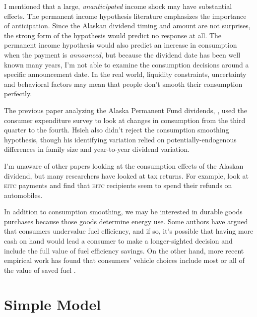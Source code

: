 \documentclass[11pt,letterpaper,oneside]{article}
\newcommand{\eitc}{\textsc{eitc}}
\begin{document}
\begin{doublespacing}
I mentioned that a large, \emph{unanticipated} income shock may have substantial effects.
The permanent income hypothesis literature emphasizes the importance of anticipation.
Since the Alaskan dividend timing and amount are not surprises, the strong form of the hypothesis would predict no response at all.
The permanent income hypothesis would also predict an increase in consumption when the payment is \emph{announced}, but because the dividend date has been well known many years, I'm not able to examine the consumption decisions around a specific announcement date.
In the real world, liquidity constraints, uncertainty and behavioral factors may mean that people don't smooth their consumption perfectly.

The previous paper analyzing the Alaska Permanent Fund dividends, \textcite{hsieh2003}, used the consumer expenditure survey to look at changes in consumption from the third quarter to the fourth.
Hsieh also didn't reject the consumption smoothing hypothesis, though his identifying variation relied on potentially\hyp{}endogenous differences in family size and year\hyp{}to\hyp{}year dividend variation.

I'm unaware of other papers looking at the consumption effects of the Alaskan dividend, but many researchers have looked at tax returns.
For example, \textcite{goodman2008eitc} look at \eitc{} payments and find that \eitc{} recipients seem to spend their refunds on automobiles.

In addition to consumption smoothing, we may be interested in durable goods purchases because those goods determine energy use.
Some authors have argued that consumers undervalue fuel efficiency, and if so, it's possible that having more cash on hand would lead a consumer to make a longer\hyp{}sighted decision and include the full value of fuel efficiency savings.
On the other hand, more recent empirical work has found that consumers' vehicle choices include most or all of the value of saved fuel \parencite{busse2013consumers, allcott2014gasoline, grigolon2014consumer, sallee2016consumers}.



\section{Simple Model}
\label{sec:model}


\end{doublespacing}
\end{document}

